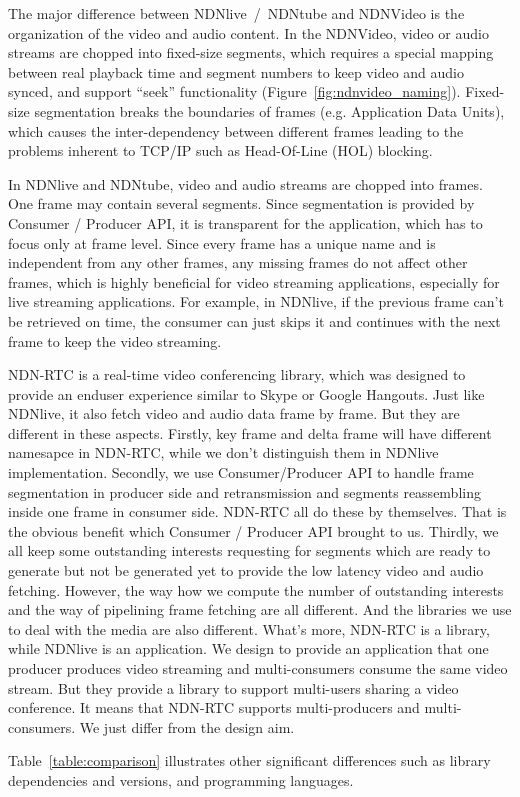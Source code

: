 The major difference between NDNlive~/~NDNtube and NDNVideo is the organization of the video and audio content. In the NDNVideo, video or audio streams are chopped into fixed-size segments, which requires a special mapping between real playback time and segment numbers to keep video and audio synced, and support ``seek'' functionality (Figure~\ref{fig:ndnvideo_naming}). Fixed-size segmentation breaks the boundaries of frames (e.g. Application Data Units), which causes the inter-dependency between different frames leading to the problems inherent to TCP/IP such as Head-Of-Line (HOL) blocking.

In NDNlive and NDNtube, video and audio streams are chopped into frames. One frame may contain several segments. Since segmentation is provided by Consumer / Producer API, it is transparent for the application, which has to focus only at frame level. Since every frame has a unique name and is independent from any other frames, any missing frames do not affect other frames, which is highly beneficial for video streaming applications, especially for live streaming applications. For example, in NDNlive, if the previous frame can't be retrieved on time, the consumer can just skips it and continues with the next frame to keep the video streaming. 

NDN-RTC \cite{ndn-rtc} is a real-time video conferencing library, which was designed to provide an enduser experience similar to Skype or Google Hangouts. Just like NDNlive, it also fetch video and audio data frame by frame. But they are different in these aspects. Firstly, key frame and delta frame will have different namesapce in NDN-RTC, while we don't distinguish them in NDNlive implementation. Secondly, we use Consumer/Producer API to handle frame segmentation in producer side and retransmission and segments reassembling inside one frame in consumer side. NDN-RTC all do these by themselves. That is the obvious benefit which Consumer / Producer API brought to us. Thirdly, we all keep some outstanding interests requesting for segments which are ready to generate but not be generated yet to provide the low latency video and audio fetching. However, the way how we compute the number of outstanding interests and the way of pipelining frame fetching are all different. And the libraries we use to deal with the media are also different. What's more, NDN-RTC is a library, while NDNlive is an application. We design to provide an application that one producer produces video streaming and multi-consumers consume the same video stream. But they provide a library to support multi-users sharing a video conference. It means that NDN-RTC supports multi-producers and multi-consumers. We just differ from the design aim.

Table~\ref{table:comparison} illustrates other significant differences such as library dependencies and versions, and programming languages.


